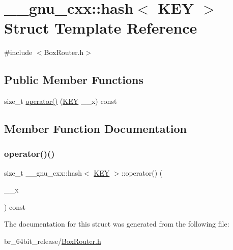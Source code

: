 \hypertarget{struct____gnu__cxx_1_1hash_3_01KEY_01_4}{}\section{\+\_\+\+\_\+gnu\+\_\+cxx\+::hash$<$ K\+EY $>$ Struct Template Reference}
\label{struct____gnu__cxx_1_1hash_3_01KEY_01_4}


{\ttfamily \#include $<$Box\+Router.\+h$>$}

\subsection*{Public Member Functions}
\begin{DoxyCompactItemize}
\item 
size\+\_\+t \mbox{\hyperlink{struct____gnu__cxx_1_1hash_3_01KEY_01_4_a3031f1ae97cd3305cc62effb1fb7f7f8}{operator()}} (\mbox{\hyperlink{res2dmp_8cpp_a8ae9d53f33f46cfcfcb9736e6351452a}{K\+EY}} \+\_\+\+\_\+x) const
\end{DoxyCompactItemize}


\subsection{Member Function Documentation}
\mbox{\label{struct____gnu__cxx_1_1hash_3_01KEY_01_4_a3031f1ae97cd3305cc62effb1fb7f7f8}} 
\subsubsection{\texorpdfstring{operator()()}{operator()()}}
{\footnotesize\ttfamily size\+\_\+t \+\_\+\+\_\+gnu\+\_\+cxx\+::hash$<$ \mbox{\hyperlink{res2dmp_8cpp_a8ae9d53f33f46cfcfcb9736e6351452a}{K\+EY}} $>$\+::operator() (\begin{DoxyParamCaption}\item[{\mbox{\hyperlink{res2dmp_8cpp_a8ae9d53f33f46cfcfcb9736e6351452a}{K\+EY}}}]{\+\_\+\+\_\+x }\end{DoxyParamCaption}) const\hspace{0.3cm}{\ttfamily [inline]}}



The documentation for this struct was generated from the following file\+:\begin{DoxyCompactItemize}
\item 
br\+\_\+64bit\+\_\+release/\mbox{\hyperlink{BoxRouter_8h}{Box\+Router.\+h}}\end{DoxyCompactItemize}
